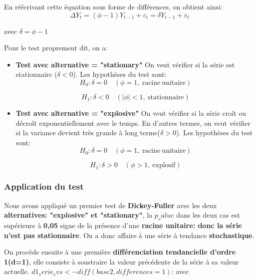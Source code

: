 \documentclass[
12pt,          %
a4paper,       %
oneside,       %
openright      %
]{report}
\begin{document}
En réécrivant cette équation sous forme de différences, on obtient ainsi: 
\[
\Delta Y_t =(\phi -1 ) Y_{t-1} + \varepsilon_t = \delta Y_{t-1} + \varepsilon_t
\]
 
 avec $\delta = \phi -1$
 
 Pour le test proprement dit, on a: 
 \begin{itemize}
 \item \textbf {Test avec alternative = "stationary"}
 On veut vérifier si la série est stationnaire ($\delta <0$).
 Les hypothèses du test sont: 
 \[
 H_0 : \delta = 0 \quad (\phi = 1,\ \mathrm{racine\ unitaire})
 \]
 
 \[
 H_1 : \delta < 0 \quad (|\phi| < 1,\ \mathrm{stationnaire})
 \] 
 
 \item \textbf {Test avec alternative = "explosive"}
 On veut vérifier si la série croît ou décroît exponentiellement avec le temps. En d'autres termes, on veut vérifier si la variance devient très grande à long terme($\delta >0$).
 Les hypothèses du test sont: 
 \[
 H_0 : \delta = 0 \quad (\phi = 1,\ \mathrm{racine\ unitaire})
 \]
 
 \[
 H_1 : \delta > 0 \quad (\phi > 1,\ \mathrm{explosif})
 \]
 

 \end{itemize}
 
 
 \subsubsection{Application du test}
 
 Nous avons appliqué un premier test de \textbf{Dickey-Fuller} avec les deux \textbf{alternatives: "explosive" et "stationary"}, la \textbf{$p_value$} dans les deux cas est supérieure à \textbf{0,05} signe de la présence d'une \textbf{racine unitaire: donc la série n'est pas stationnaire}. On a donc affaire à une série à tendance \textbf{stochastique}.
 
  \begin{table}[H]
 	\centering
 	
 	\caption{Tests de Dickey-Fuller sur la série de janvier2015-décembre2022}
 	\label{tab:tests_stationnaire1_cvs}
 \end{table}
 
 
 
 On procède ensuite à une première \textbf{différenciation tendancielle d'ordre 1(d=1)}, elle consiste à soustraire la valeur précédente de la  série à sa valeur actuelle. \textbf{$d1_serie_cvs <- diff(base2, differences=1)
 $}: 
 avec 
 
\end{document}

